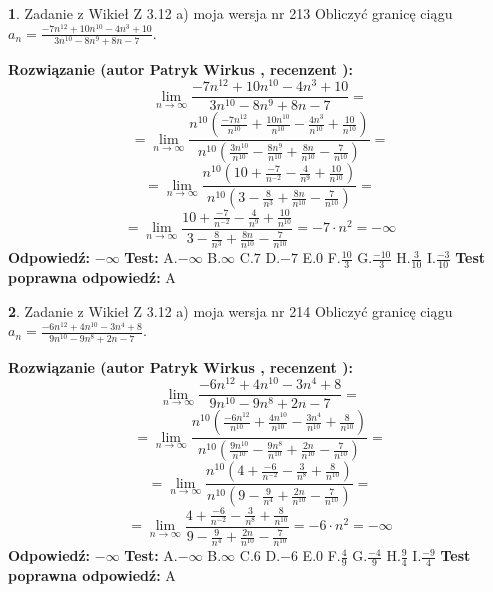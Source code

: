 \documentclass[12pt, a4paper]{article}
\theoremstyle{definition} %
\newtheorem{zad}{}
\newcommand{\zadStart}[1]{\begin{zad}#1\newline}
\newcommand{\zadStop}{\end{zad}}
\newcommand{\rozwStart}[2]{\noindent \textbf{Rozwiązanie (autor #1 , recenzent #2): }\newline}
\newcommand{\rozwStop}{\newline}
\newcommand{\odpStart}{\noindent \textbf{Odpowiedź:}\newline}
\newcommand{\odpStop}{\newline}
\newcommand{\testStart}{\noindent \textbf{Test:}\newline}
\newcommand{\testStop}{\newline}
\newcommand{\kluczStart}{\noindent \textbf{Test poprawna odpowiedź:}\newline}
\newcommand{\kluczStop}{\newline}
\begin{document}
\zadStart{Zadanie z Wikieł Z 3.12 a) moja wersja nr 213}
Obliczyć granicę ciągu $a_{n}=\frac{-7n^{12}+10n^{10}-4n^{3}+10}{3n^{10}-8n^{9}+8n-7}$.
\zadStop
\rozwStart{Patryk Wirkus}{}
$$\lim\limits_{n\to\infty}\frac{-7n^{12}+10n^{10}-4n^{3}+10}{3n^{10}-8n^{9}+8n-7}=$$
$$=\lim\limits_{n\to\infty}\frac{n^{10}\left(\frac{-7n^{12}}{n^{10}}+\frac{10n^{10}}{n^{10}}-\frac{4n^{3}}{n^{10}}+\frac{10}{n^{10}}\right)}{n^{10}\left(\frac{3n^{10}}{n^{10}}-\frac{8n^{9}}{n^{10}}+\frac{8n}{n^{10}}-\frac{7}{n^{10}}\right)}=$$
$$=\lim\limits_{n\to\infty}\frac{n^{10}\left(10+\frac{-7}{n^{-2}}-\frac{4}{n^{9}}+\frac{10}{n^{10}}\right)}
{n^{10}\left(3-\frac{8}{n^{3}}+\frac{8n}{n^{10}}-\frac{7}{n^{10}}\right)}=$$
$$=\lim\limits_{n\to\infty}\frac{10+\frac{-7}{n^{-2}}-\frac{4}{n^{9}}+\frac{10}{n^{10}}}{3-\frac{8}{n^{3}}+\frac{8n}{n^{10}}-\frac{7}{n^{10}}}=-7\cdot n^{2} = -\infty$$
\rozwStop
\odpStart
$-\infty$
\odpStop
\testStart
A.$-\infty$
B.$\infty$
C.$7$
D.$-7$
E.$0$
F.$\frac{10}{3}$
G.$\frac{-10}{3}$
H.$\frac{3}{10}$
I.$\frac{-3}{10}$
\testStop
\kluczStart
A
\kluczStop



\zadStart{Zadanie z Wikieł Z 3.12 a) moja wersja nr 214}
Obliczyć granicę ciągu $a_{n}=\frac{-6n^{12}+4n^{10}-3n^{4}+8}{9n^{10}-9n^{8}+2n-7}$.
\zadStop
\rozwStart{Patryk Wirkus}{}
$$\lim\limits_{n\to\infty}\frac{-6n^{12}+4n^{10}-3n^{4}+8}{9n^{10}-9n^{8}+2n-7}=$$
$$=\lim\limits_{n\to\infty}\frac{n^{10}\left(\frac{-6n^{12}}{n^{10}}+\frac{4n^{10}}{n^{10}}-\frac{3n^{4}}{n^{10}}+\frac{8}{n^{10}}\right)}{n^{10}\left(\frac{9n^{10}}{n^{10}}-\frac{9n^{8}}{n^{10}}+\frac{2n}{n^{10}}-\frac{7}{n^{10}}\right)}=$$
$$=\lim\limits_{n\to\infty}\frac{n^{10}\left(4+\frac{-6}{n^{-2}}-\frac{3}{n^{8}}+\frac{8}{n^{10}}\right)}
{n^{10}\left(9-\frac{9}{n^{4}}+\frac{2n}{n^{10}}-\frac{7}{n^{10}}\right)}=$$
$$=\lim\limits_{n\to\infty}\frac{4+\frac{-6}{n^{-2}}-\frac{3}{n^{8}}+\frac{8}{n^{10}}}{9-\frac{9}{n^{4}}+\frac{2n}{n^{10}}-\frac{7}{n^{10}}}=-6\cdot n^{2} = -\infty$$
\rozwStop
\odpStart
$-\infty$
\odpStop
\testStart
A.$-\infty$
B.$\infty$
C.$6$
D.$-6$
E.$0$
F.$\frac{4}{9}$
G.$\frac{-4}{9}$
H.$\frac{9}{4}$
I.$\frac{-9}{4}$
\testStop
\kluczStart
A
\kluczStop
\end{document}
